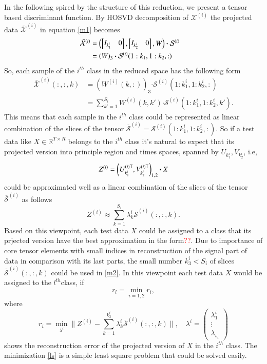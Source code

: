 \documentclass[preprint,12pt]{elsarticle}
\begin{document}
In the following  spired by the structure of this reduction, we present a tensor based discriminant function.
By HOSVD decomposition of
$\mathcal{X}^{(i)}$ the projected data $\overline{\mathcal{X}}^{(i)}$ in equation \eqref{m1} becomes
\begin{align}
\bar{\mathcal{X}}^{(i)}&=  \notag
\left(
\begin{bmatrix}
I_{k_1^i} &  0
\end{bmatrix},
\begin{bmatrix}
I_{k_2^i} &  0
\end{bmatrix},
W
\right)\boldsymbol{\cdot} \mathcal{S}^{(i)} \notag
\\&=\left( 
W
\right)_{3} \boldsymbol{\cdot} \mathcal{S}^{(i)}(1:k_1, 1:k_2, :) \notag &
\end{align}
So,  each sample of the $i^{th}$ class in the reduced space has the following form
\begin{align*}
\bar{{\mathcal{X}}}^{(i)}(:,:,k) &= \left(  
W^{(i)}(k,:)
\right)_{3} \boldsymbol{\cdot} \mathcal{S}^{(i)}(1:k_1^i, 1:k_2^i, :)\\
&= \sum_{k' = 1}^{S_i} W^{(i)}(k,k') \boldsymbol{\cdot} \mathcal{S}^{(i)}(1:k_1^i, 1:k_2^i, k').
\end{align*}
This means that each sample in the $i^{th}$ class could be represented as linear combination of the slices  of the tensor $\overline{\mathcal{S}}^{(i)}=\mathcal{S}^{(i)}(1:k_1^i, 1:k_2^i, :)$.
So if a test data like $X\in \mathbb{R}^{T\times R}$ belongs to the $i^{th}$ class
it's natural to expect that its
projected version into principle region and times spaces, spanned by $U_{k_1^i},V_{k_2^i}$, i.e,
\[
Z^{(i)}= \left( U_{k_1^i}^{(i)\sf T}, V_{k_2^i}^{(i)\sf T} 
\right)_{1,2}\boldsymbol{\cdot} X
\]
could be approximated well as a linear combination of the slices of the tensor $\overline{\mathcal{S}}^{(i)}$ as follows
\begin{equation}
\label{m2}
Z^{(i)} \approx \sum_{k=1}^{S_i} \lambda_k^i \overline{\mathcal{S}}^{(i)}(:,:,k).
\end{equation}
Based on this viewpoint, each test data $X$ could be assigned to a class that its prjected version have the best approximation in the form\textcolor{red}{??}. 
Due to importance of core tensor elements with small indices in reconstruction of the signal part of data in comparison with its last parts,
the small number $k_3^i< S_i$  of slices $\overline{\mathcal{S}}^{(i)}(:,:,k)$ could be used  in  \eqref{m2}. 
In this viewpoint each test data
$X$ would be assigned to the $l^{th}$class, if
\[
r_{l}=\min_{i=1,2} {r_{i}},
\]
where
\begin{equation}
\label{ls}
r_{i}=\min_{{\lambda^{i}}} \|Z^{(i)} -\sum_{k=1}^{k_3^i} \lambda_k^i \overline{\mathcal{S}}^{(i)}(:,:,k)\|,\quad
\lambda^i=\begin{pmatrix}
\lambda_1^i\\
\vdots\\
\lambda_{s_i}
\end{pmatrix}
\end{equation}
shows the  reconstruction error of the projected version of $X$ in the $i^{th}$ class.
The minimization  \eqref{ls} is a simple least square problem that could be solved easily.
\end{document}
